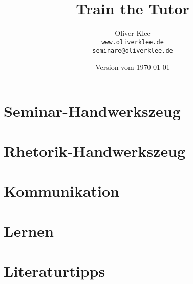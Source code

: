 \documentclass[a4paper,openany,twoside,titlepage,10pt,headsepline]{scrbook}
\title{Train the Tutor}
\author{Oliver Klee\\\texttt{www.oliverklee.de}\\\texttt{seminare@oliverklee.de}}
\date{Version vom \today}
\begin{document}
\frontmatter

\maketitle

\tableofcontents

\mainmatter

\chapter{Seminar-Handwerkszeug}










\chapter{Rhetorik-Handwerkszeug}




\chapter{Kommunikation}






\chapter{Lernen}















\backmatter

\chapter{Literaturtipps}
\end{document}
